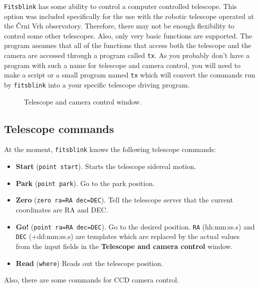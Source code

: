 \documentclass[11pt]{article}
\begin{document}
\verb=Fitsblink= has some ability to control a computer controlled
telescope.  This option was included specifically for the use with the
robotic telescope operated at the \v{C}rni Vrh observatory.  Therefore,
there may not be enough flexibility to control some other telescopes.
Also, only very basic functions are supported.  The program assumes
that all of the functions that access both the telescope and the
camera are accessed through a program called \verb=tx=.  As you
probably don't have a program with such a name for telescope and
camera control, you will need to make a script or a small program
named \verb=tx= which will convert the commands run by
\verb=fitsblink= into a your specific telescope driving program.

\begin{figure}
\begin{center}
\epsfxsize=8cm
\caption{Telescope and camera control window.}
\label{control}
\end{center}
\end{figure}


\subsection{Telescope commands}

At the moment, \verb=fitsblink= knows the following telescope
commands:

\begin{itemize}
\item \textbf{Start} (\verb+point start+).  Starts the telescope
sidereal motion.
\item \textbf{Park} (\verb+point park+).  Go to the park position.
\item \textbf{Zero} (\verb+zero ra=RA dec=DEC+).  Tell the
telescope server that the current coordinates  are RA and DEC.
\item \textbf{Go!} (\verb+point ra=RA dec=DEC+).  Go to the desired
position.  \verb=RA= (hh:mm:ss.s) and \verb=DEC= (+dd:mm:ss.s) are
templates which are replaced by the actual values from the input
fields in the \textbf{Telescope and camera control} window.
\item \textbf{Read} (\verb=where=) Reads out the telescope position.
\end{itemize}

Also, there are some commands for CCD camera control.
\end{document}
